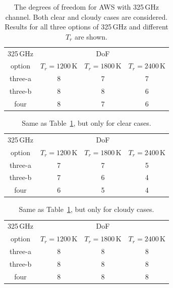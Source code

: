 \documentclass[12pt]{article}
\begin{document}
\begin{table}[!p]
	\centering
	\begin{tabular}[b]{c|c|c|c}
		 325\,GHz & \multicolumn{3}{c}{DoF}   \\
		 option &  $T_r = 1200 $\,K &   $T_r = 1800 $\,K &   $T_r = 2400$\,K \\
		\hline
		three-a &                8 &                7 &                7 \\
		three-b &                8 &                8 &                6 \\
		four    &                8 &                7 &                6 \\
		\hline
	\end{tabular}
	\caption{The degrees of freedom for AWS with 325\,GHz channel. Both clear and cloudy cases are considered. Results for all three options of 325\,GHz and different $T_r$ are shown.    }
	\label{tab:DoF:all}
\end{table}

\begin{table}[!p]
	\centering
	\begin{tabular}[b]{c|c|c|c}
	325\,GHz & \multicolumn{3}{c}{DoF}   \\
	option &  $T_r = 1200 $\,K &   $T_r = 1800 $\,K &   $T_r = 2400$\,K \\
	\hline
	three-a &                7 &                7 &                5 \\
	three-b &                7 &                6 &                4 \\
	four    &                6 &                5 &                4 \\
	\hline
\end{tabular}
	\caption{Same as Table~\ref{tab:DoF:all}, but only for clear cases.}
\label{tab:DoF:clear}
\end{table}

\begin{table}[!p]
	\centering
	\begin{tabular}[b]{c|c|c|c}
	325\,GHz & \multicolumn{3}{c}{DoF}   \\
	option &  $T_r = 1200 $\,K &   $T_r = 1800 $\,K &   $T_r = 2400$\,K \\
		\hline
		three-a &                8 &                8 &                8 \\
		three-b &                8 &                8 &                8 \\
		four    &                8 &                8 &                8 \\
		\hline
	\end{tabular}
	\caption{Same as Table~\ref{tab:DoF:all}, but only for cloudy cases.  }
	\label{tab:DoF:cloudy}
\end{table}
\end{document}

